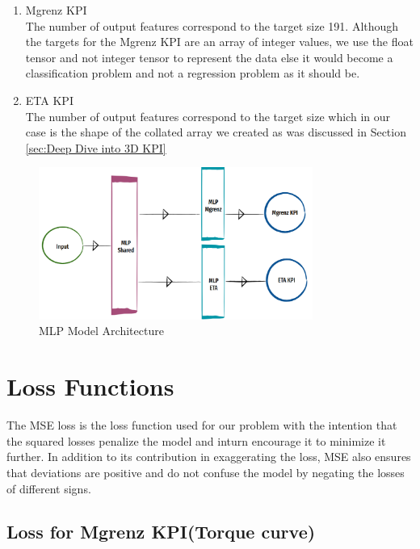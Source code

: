 \documentclass{report} %
\begin{document}
\begin{enumerate}
    \item Mgrenz \ac{KPI} \\
    The number of output features correspond to the target size 191.
    Although the targets for the Mgrenz \ac{KPI} are an array of integer values, we use the float tensor and not integer tensor to represent the data else it would become a classification problem and not a regression problem as it should be. \\
    \item ETA \ac{KPI} \\
    The number of output features correspond to the target size which in our case is the shape of the collated array we created as was discussed in Section \ref{sec:Deep Dive into 3D KPI}
\end{enumerate}

\begin{figure}[H]
    \centering
    \includegraphics[width=0.8\textwidth]{./ReportImages/mlp_architecture.png} 
    \caption{MLP Model Architecture}
    \label{fig:MLP Model Architecture}
\end{figure}

\section{Loss Functions}\label{sec:Loss Functions}
The \ac{MSE} loss is the loss function used for our problem with the intention that the squared losses penalize the model and inturn encourage it to minimize it further.
In addition to its contribution in exaggerating the loss, \ac{MSE} also ensures that deviations are positive and do not confuse the model by negating the losses of different signs. \\

\subsection{Loss for Mgrenz \ac{KPI}(Torque curve)}\label{sec:Loss for 2D KPI}
\end{document}
